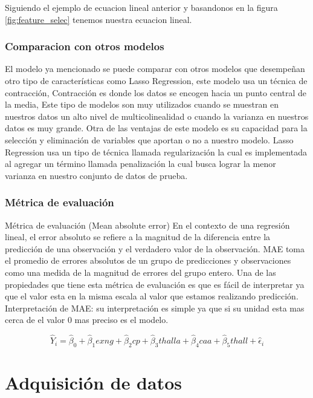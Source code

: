 \documentclass[10pt,journal]{IEEEtran}
\begin{document}
Siguiendo el ejemplo de ecuacion lineal anterior y basandonos en la figura \ref{fig:feature_selec} tenemos nuestra ecuacion lineal.

\subsubsection{Comparacion con otros modelos}

El modelo ya mencionado se puede comparar con otros modelos que desempeñan otro tipo de características como Lasso Regression, este modelo usa un técnica de contracción, Contracción es donde los datos se encogen hacia un punto central de la media, Este tipo de modelos son muy utilizados cuando se muestran en nuestros datos un alto nivel de multicolinealidad o cuando la varianza en nuestros datos es muy grande. Otra de las ventajas de este modelo es su capacidad para la selección y eliminación de variables que aportan o no a nuestro modelo. Lasso Regression usa un tipo de técnica llamada regularización la cual es implementada al agregar un término llamada penalización la cual busca lograr la menor varianza en nuestro conjunto de datos de prueba.

\subsubsection{Métrica de evaluación}

Métrica de evaluación (Mean absolute error)
En el contexto de una regresión lineal, el error absoluto se refiere a la magnitud de la diferencia entre la predicción de una observación y el verdadero valor de la observación.
MAE toma el promedio de errores absolutos de un grupo de predicciones y observaciones como una medida de la magnitud de errores del grupo entero. Una de las propiedades que tiene esta métrica de evaluación es que es fácil de interpretar ya que el valor esta en la misma escala al valor que estamos realizando predicción.
Interpretación de MAE: su interpretación es simple ya que si su unidad esta mas cerca de el valor 0 mas preciso es el modelo.


\begin{equation}
\hat{Y}_i = \hat{\beta}_0 + \hat{\beta}_1 exng  + \hat{\beta}_2 cp  + \hat{\beta}_3 thalla  + \hat{\beta}_4 caa  + \hat{\beta}_5 thall + \hat{\epsilon}_i
\end{equation}


\section{Adquisición de datos}
\label{sec:adquisiciondatos}
\end{document}
